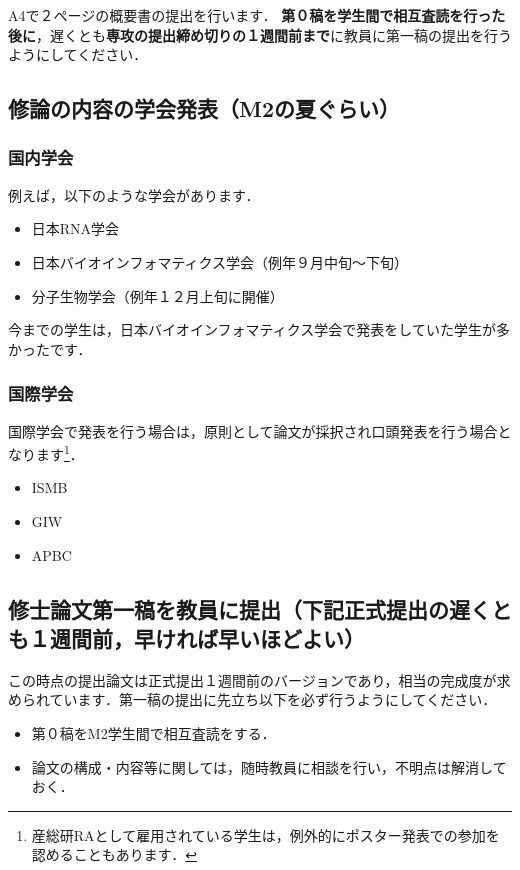 \documentclass[dvipdfmx,autodetect-engine]{jsreport}
\begin{document}
A4で２ページの概要書の提出を行います．
\textbf{第０稿を学生間で相互査読を行った後に}，遅くとも\textbf{専攻の提出締め切りの１週間前まで}に教員に第一稿の提出を行うようにしてください．

\subsection{修論の内容の学会発表（M2の夏ぐらい）}

\subsubsection{国内学会}

例えば，以下のような学会があります．
\begin{itemize}
\item 日本RNA学会
\item 日本バイオインフォマティクス学会（例年９月中旬〜下旬）
\item 分子生物学会（例年１２月上旬に開催）
\end{itemize}

今までの学生は，日本バイオインフォマティクス学会で発表をしていた学生が多かったです．

\subsubsection{国際学会}

国際学会で発表を行う場合は，原則として論文が採択され口頭発表を行う場合となります\footnote{産総研RAとして雇用されている学生は，例外的にポスター発表での参加を認めることもあります．}．

\begin{itemize}
\item ISMB
\item GIW
\item APBC
\end{itemize}

\subsection{修士論文第一稿を教員に提出（下記正式提出の遅くとも１週間前，早ければ早いほどよい）}

この時点の提出論文は正式提出１週間前のバージョンであり，相当の完成度が求められています．第一稿の提出に先立ち以下を必ず行うようにしてください．

\begin{itemize}
\item 第０稿をM2学生間で相互査読をする．
\item 論文の構成・内容等に関しては，随時教員に相談を行い，不明点は解消しておく．
\end{itemize}
\end{document}

